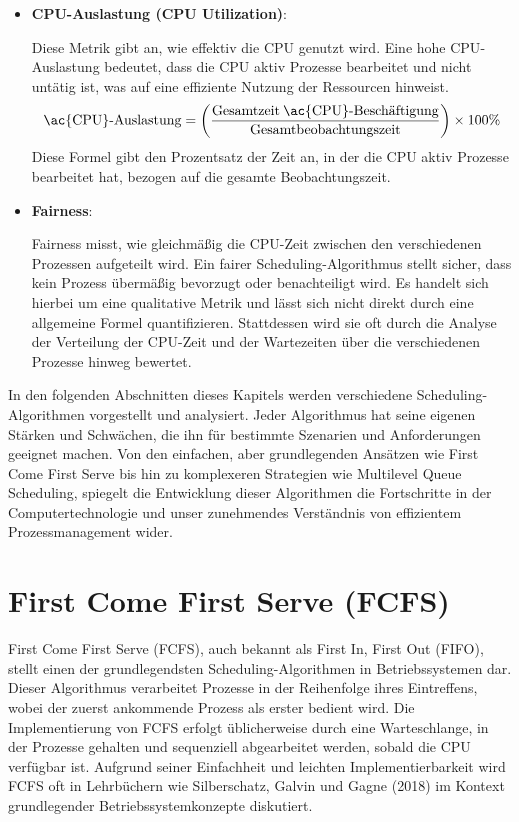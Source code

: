 \begin{itemize}
	\item \textbf{\ac{CPU}-Auslastung (\ac{CPU} Utilization)}: 
	
	Diese Metrik gibt an, wie effektiv die \ac{CPU} genutzt wird. Eine hohe \ac{CPU}-Auslastung bedeutet, dass die \ac{CPU} aktiv Prozesse bearbeitet und nicht untätig ist, was auf eine effiziente Nutzung der Ressourcen hinweist.
	\[ \text{\ac{CPU}-Auslastung} = \left( \frac{\text{Gesamtzeit\:\ac{CPU}-Beschäftigung}}{\text{Gesamtbeobachtungszeit}} \right) \times 100\% \]
	Diese Formel gibt den Prozentsatz der Zeit an, in der die CPU aktiv Prozesse bearbeitet hat, bezogen auf die gesamte Beobachtungszeit.
	
	\item \textbf{Fairness}: 
	
	Fairness misst, wie gleichmäßig die \ac{CPU}-Zeit zwischen den verschiedenen Prozessen aufgeteilt wird. Ein fairer Scheduling-Algorithmus stellt sicher, dass kein Prozess übermäßig bevorzugt oder benachteiligt wird. Es handelt sich hierbei um eine qualitative Metrik und lässt sich nicht direkt durch eine allgemeine Formel quantifizieren. Stattdessen wird sie oft durch die Analyse der Verteilung der \ac{CPU}-Zeit und der Wartezeiten über die verschiedenen Prozesse hinweg bewertet.
\end{itemize}

In den folgenden Abschnitten dieses Kapitels werden verschiedene Scheduling-Algorithmen vorgestellt und analysiert. Jeder Algorithmus hat seine eigenen Stärken und Schwächen, die ihn für bestimmte Szenarien und Anforderungen geeignet machen. Von den einfachen, aber grundlegenden Ansätzen wie First Come First Serve bis hin zu komplexeren Strategien wie Multilevel Queue Scheduling, spiegelt die Entwicklung dieser Algorithmen die Fortschritte in der Computertechnologie und unser zunehmendes Verständnis von effizientem Prozessmanagement wider.

\section{First Come First Serve (FCFS)}

First Come First Serve (FCFS), auch bekannt als First In, First Out (FIFO), stellt einen der grundlegendsten Scheduling-Algorithmen in Betriebssystemen dar. Dieser Algorithmus verarbeitet Prozesse in der Reihenfolge ihres Eintreffens, wobei der zuerst ankommende Prozess als erster bedient wird. Die Implementierung von FCFS erfolgt üblicherweise durch eine Warteschlange, in der Prozesse gehalten und sequenziell abgearbeitet werden, sobald die CPU verfügbar ist. Aufgrund seiner Einfachheit und leichten Implementierbarkeit wird FCFS oft in Lehrbüchern wie Silberschatz, Galvin und Gagne (2018) im Kontext grundlegender Betriebssystemkonzepte diskutiert.

